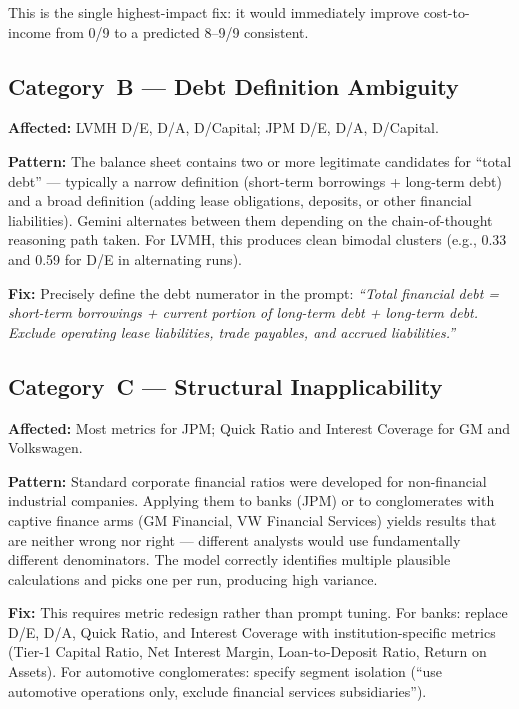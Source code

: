 \documentclass[12pt, a4paper]{article}
\begin{document}
This is the single highest-impact fix: it would immediately improve
cost-to-income from 0/9 to a predicted 8--9/9 consistent.

\subsection{Category~B --- Debt Definition Ambiguity}

\textbf{Affected:} LVMH D/E, D/A, D/Capital; JPM D/E, D/A, D/Capital.

\textbf{Pattern:} The balance sheet contains two or more legitimate candidates
for ``total debt'' --- typically a narrow definition (short-term borrowings +
long-term debt) and a broad definition (adding lease obligations, deposits,
or other financial liabilities).  Gemini alternates between them depending on
the chain-of-thought reasoning path taken.  For LVMH, this produces clean
bimodal clusters (e.g., 0.33 and 0.59 for D/E in alternating runs).

\textbf{Fix:} Precisely define the debt numerator in the prompt:
\textit{``Total financial debt = short-term borrowings + current portion of
long-term debt + long-term debt.  Exclude operating lease liabilities, trade
payables, and accrued liabilities.''}

\subsection{Category~C --- Structural Inapplicability}

\textbf{Affected:} Most metrics for JPM; Quick Ratio and Interest Coverage
for GM and Volkswagen.

\textbf{Pattern:} Standard corporate financial ratios were developed for
non-financial industrial companies.  Applying them to banks (JPM) or to
conglomerates with captive finance arms (GM Financial, VW Financial Services)
yields results that are neither wrong nor right --- different analysts would
use fundamentally different denominators.  The model correctly identifies
multiple plausible calculations and picks one per run, producing high variance.

\textbf{Fix:} This requires metric redesign rather than prompt tuning.
For banks: replace D/E, D/A, Quick Ratio, and Interest Coverage with
institution-specific metrics (Tier-1 Capital Ratio, Net Interest Margin,
Loan-to-Deposit Ratio, Return on Assets).  For automotive conglomerates:
specify segment isolation (``use automotive operations only, exclude financial
services subsidiaries'').
\end{document}
